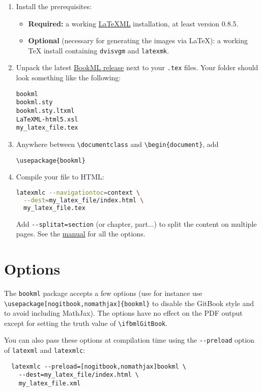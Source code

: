 \documentclass[a4paper,british]{article}
\def\ltxinline{\lstinline[style=bookml]}
\begin{document}
\begin{enumerate}
  \item Install the prerequisites:
  \begin{itemize}
    \item \textbf{Required:} a working \href{https://dlmf.nist.gov/LaTeXML/}{LaTeXML} installation, at least version 0.8.5.
    \item \textbf{Optional} (necessary for generating the images via \LaTeX): a working \TeX{} install containing \lstinline[frame=none]|dvisvgm| and \lstinline[frame=none]|latexmk|.
  \end{itemize}
  \item Unpack the latest \href{https://github.com/vlmantova/bookml/releases}{BookML release} next to your \lstinline[frame=none]|.tex| files. Your folder should look something like the following:
    \begin{lstlisting}
bookml
bookml.sty
bookml.sty.ltxml
LaTeXML-html5.xsl
my_latex_file.tex
    \end{lstlisting}
  \item Anywhere between \ltxinline|\documentclass| and \ltxinline|\begin{document}|, add
    \begin{lstlisting}[style=bookml]
\usepackage{bookml}
    \end{lstlisting}
  \item Compile your file to HTML:
    \begin{lstlisting}[language=bash]
latexmlc --navigationtoc=context \
  --dest=my_latex_file/index.html \
  my_latex_file.tex
    \end{lstlisting}
    Add \ltxinline|--splitat=section| (or chapter, part...) to split the content on multiple pages. See the \LaTeXML{} \href{https://dlmf.nist.gov/LaTeXML/manual/usage/}{manual} for all the options.
\end{enumerate}

\section{Options}

The \ltxinline|bookml| package accepts a few options (use for instance use \ltxinline|\usepackage[nogitbook,nomathjax]{bookml}| to disable the GitBook style and to avoid including MathJax). The options have no effect on the PDF output except for setting the truth value of \ltxinline|\ifbmlGitBook|.

You can also pass these options at compilation time using the \ltxinline|--preload| option of \ltxinline|latexml| and \ltxinline|latexmlc|:
\begin{lstlisting}
  latexmlc --preload=[nogitbook,nomathjax]bookml \
    --dest=my_latex_file/index.html \
    my_latex_file.xml
\end{lstlisting}
\end{document}
